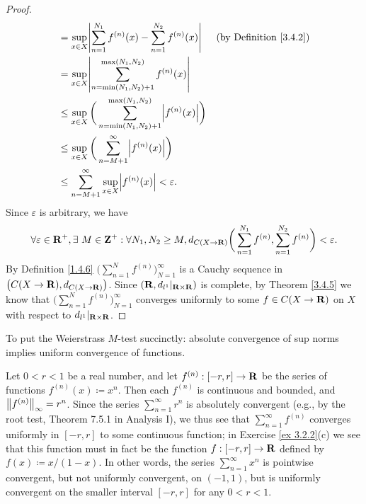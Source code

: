 \begin{proof}
\begin{align*}
                                 & = \sup_{x \in X} \abs{\sum_{n = 1}^{N_1} f^{(n)}(x) - \sum_{n = 1}^{N_2} f^{(n)}(x)}            & \text{(by Definition \ref{3.4.2})} \\
                                 & = \sup_{x \in X} \abs{\sum_{n = \min(N_1, N_2) + 1}^{\max(N_1, N_2)} f^{(n)}(x)}                                                     \\
                                 & \leq \sup_{x \in X} \bigg(\sum_{n = \min(N_1, N_2) + 1}^{\max(N_1, N_2)} \abs{f^{(n)}(x)}\bigg)                                      \\
                                 & \leq \sup_{x \in X} \bigg(\sum_{n = M + 1}^\infty \abs{f^{(n)}(x)}\bigg)                                                             \\
                                 & \leq \sum_{n = M + 1}^\infty \sup_{x \in X} \abs{f^{(n)}(x)} < \varepsilon.
    \end{align*}
    Since \(\varepsilon\) is arbitrary, we have
    \[
        \forall \varepsilon \in \R^+, \exists\ M \in \Z^+ : \forall N_1, N_2 \geq M, d_{C(X \to \R)}\bigg(\sum_{n = 1}^{N_1} f^{(n)}, \sum_{n = 1}^{N_2} f^{(n)}\bigg) < \varepsilon.
    \]
    By Definition \ref{1.4.6} \(\bigg(\sum_{n = 1}^N f^{(n)}\bigg)_{N = 1}^\infty\) is a Cauchy sequence in \(\big(C(X \to \R), d_{C(X \to \R)}\big)\).
    Since \((\R, d_{l^1}|_{\R \times \R})\) is complete, by Theorem \ref{3.4.5} we know that \(\bigg(\sum_{n = 1}^N f^{(n)}\bigg)_{N = 1}^\infty\) converges uniformly to some \(f \in C(X \to \R)\) on \(X\) with respect to \(d_{l^1}|_{\R \times \R}\).
\end{proof}

\begin{note}
    To put the Weierstrass \(M\)-test succinctly:
    absolute convergence of sup norms implies uniform convergence of functions.
\end{note}

\begin{example}\label{3.5.8}
    Let \(0 < r < 1\) be a real number, and let \(f^{(n)} : [-r, r] \to \R\) be the series of functions \(f^{(n)}(x) \coloneqq x^n\).
    Then each \(f^{(n)}\) is continuous and bounded, and \(\norm*{f^{(n)}}_\infty = r^n\).
    Since the series \(\sum_{n = 1}^\infty r^n\) is absolutely convergent (e.g., by the root test, Theorem 7.5.1 in Analysis I), we thus see that \(\sum_{n = 1}^\infty f^{(n)}\) converges uniformly in \([-r, r]\) to some continuous function;
    in Exercise \ref{ex 3.2.2}(c) we see that this function must in fact be the function \(f : [-r, r] \to \R\) defined by \(f(x) \coloneqq x / (1 - x)\).
    In other words, the series \(\sum_{n = 1}^\infty x^n\) is pointwise convergent, but not uniformly convergent, on \((-1, 1)\), but is uniformly convergent on the smaller interval \([-r, r]\) for any \(0 < r < 1\).
\end{example}

